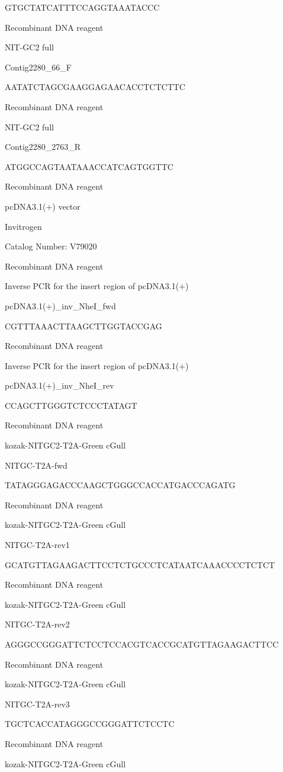 \documentclass[
  10pt,
  onecolumn]{article}
\begin{document}
GTGCTATCATTTCCAGGTAAATACCC

Recombinant DNA reagent

NIT-GC2 full

Contig2280\_66\_F

AATATCTAGCGAAGGAGAACACCTCTCTTC

Recombinant DNA reagent

NIT-GC2 full

Contig2280\_2763\_R

ATGGCCAGTAATAAACCATCAGTGGTTC

Recombinant DNA reagent

pcDNA3.1(+) vector

Invitrogen

Catalog Number: V79020

Recombinant DNA reagent

Inverse PCR for the insert region of pcDNA3.1(+)

pcDNA3.1(+)\_inv\_NheI\_fwd

CGTTTAAACTTAAGCTTGGTACCGAG

Recombinant DNA reagent

Inverse PCR for the insert region of pcDNA3.1(+)

pcDNA3.1(+)\_inv\_NheI\_rev

CCAGCTTGGGTCTCCCTATAGT

Recombinant DNA reagent

kozak-NITGC2-T2A-Green cGull

NITGC-T2A-fwd

TATAGGGAGACCCAAGCTGGGCCACCATGACCCAGATG

Recombinant DNA reagent

kozak-NITGC2-T2A-Green cGull

NITGC-T2A-rev1

GCATGTTAGAAGACTTCCTCTGCCCTCATAATCAAACCCCTCTCT

Recombinant DNA reagent

kozak-NITGC2-T2A-Green cGull

NITGC-T2A-rev2

AGGGCCGGGATTCTCCTCCACGTCACCGCATGTTAGAAGACTTCC

Recombinant DNA reagent

kozak-NITGC2-T2A-Green cGull

NITGC-T2A-rev3

TGCTCACCATAGGGCCGGGATTCTCCTC

Recombinant DNA reagent

kozak-NITGC2-T2A-Green cGull
\end{document}
